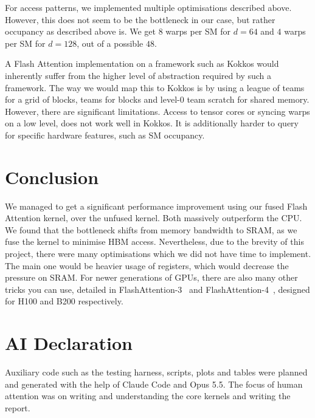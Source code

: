 \documentclass[12pt]{article}
\begin{document}
For access patterns, we implemented multiple optimisations described above. However, this does not seem to be the bottleneck in our case, but rather occupancy as described above is. We get $8$ warps per SM for $d=64$ and $4$ warps per SM for $d=128$, out of a possible $48$.

A Flash Attention implementation on a framework such as Kokkos would inherently suffer from the higher level of abstraction required by such a framework. The way we would map this to Kokkos is by using a league of teams for a grid of blocks, teams for blocks and level-0 team scratch for shared memory. However, there are significant limitations. Access to tensor cores or syncing warps on a low level, does not work well in Kokkos. It is additionally harder to query for specific hardware features, such as SM occupancy. 

\section{Conclusion}
We managed to get a significant performance improvement using our fused Flash Attention kernel, over the unfused kernel. Both massively outperform the CPU. We found that the bottleneck shifts from memory bandwidth to SRAM, as we fuse the kernel to minimise HBM access. Nevertheless, due to the brevity of this project, there were many optimisations which we did not have time to implement. The main one would be heavier usage of registers, which would decrease the pressure on SRAM. For newer generations of GPUs, there are also many other tricks you can use, detailed in FlashAttention-3~\cite{shah2024flashattention3} and FlashAttention-4~\cite{zadouri2026flashattention4}, designed for H100 and B200 respectively.

\section{AI Declaration}
Auxiliary code such as the testing harness, scripts, plots and tables were planned and generated with the help of Claude Code and Opus 5.5. The focus of human attention was on writing and understanding the core kernels and writing the report.





\end{document}
